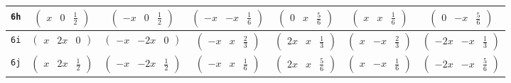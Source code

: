 \documentclass[fleqn,9pt,landscape]{jsarticle}
\begin{document}
\begin{center}
\begin{longtable}{ccccccc}
{\tt 6h} & $ \begin{pmatrix} x & 0 & \frac{1}{2} \end{pmatrix} $ & $ \begin{pmatrix} - x & 0 & \frac{1}{2} \end{pmatrix} $ & $ \begin{pmatrix} - x & - x & \frac{1}{6} \end{pmatrix} $ & $ \begin{pmatrix} 0 & x & \frac{5}{6} \end{pmatrix} $ & $ \begin{pmatrix} x & x & \frac{1}{6} \end{pmatrix} $ & $ \begin{pmatrix} 0 & - x & \frac{5}{6} \end{pmatrix} $ \\ \hline
{\tt 6i} & $ \begin{pmatrix} x & 2 x & 0 \end{pmatrix} $ & $ \begin{pmatrix} - x & - 2 x & 0 \end{pmatrix} $ & $ \begin{pmatrix} - x & x & \frac{2}{3} \end{pmatrix} $ & $ \begin{pmatrix} 2 x & x & \frac{1}{3} \end{pmatrix} $ & $ \begin{pmatrix} x & - x & \frac{2}{3} \end{pmatrix} $ & $ \begin{pmatrix} - 2 x & - x & \frac{1}{3} \end{pmatrix} $ \\ \hline
{\tt 6j} & $ \begin{pmatrix} x & 2 x & \frac{1}{2} \end{pmatrix} $ & $ \begin{pmatrix} - x & - 2 x & \frac{1}{2} \end{pmatrix} $ & $ \begin{pmatrix} - x & x & \frac{1}{6} \end{pmatrix} $ & $ \begin{pmatrix} 2 x & x & \frac{5}{6} \end{pmatrix} $ & $ \begin{pmatrix} x & - x & \frac{1}{6} \end{pmatrix} $ & $ \begin{pmatrix} - 2 x & - x & \frac{5}{6} \end{pmatrix} $ \\ \hline

\end{longtable}
\end{center}
\end{document}
